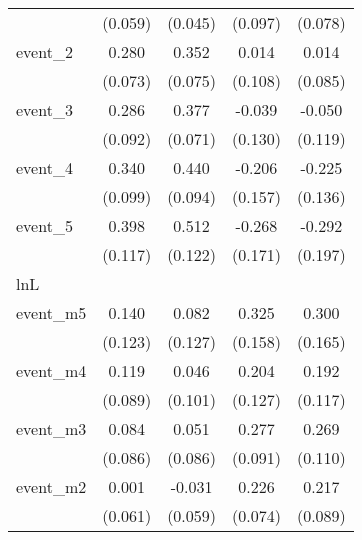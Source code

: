 {\begin{tabular}{l*{4}{c}}
            &     (0.059)         &     (0.045)         &     (0.097)         &     (0.078)         \\
[1em]
event\_2     &       0.280\sym{***}&       0.352\sym{***}&       0.014         &       0.014         \\
            &     (0.073)         &     (0.075)         &     (0.108)         &     (0.085)         \\
[1em]
event\_3     &       0.286\sym{**} &       0.377\sym{***}&      -0.039         &      -0.050         \\
            &     (0.092)         &     (0.071)         &     (0.130)         &     (0.119)         \\
[1em]
event\_4     &       0.340\sym{***}&       0.440\sym{***}&      -0.206         &      -0.225         \\
            &     (0.099)         &     (0.094)         &     (0.157)         &     (0.136)         \\
[1em]
event\_5     &       0.398\sym{***}&       0.512\sym{***}&      -0.268         &      -0.292         \\
            &     (0.117)         &     (0.122)         &     (0.171)         &     (0.197)         \\
\hline
lnL         &                     &                     &                     &                     \\
event\_m5    &       0.140         &       0.082         &       0.325\sym{*}  &       0.300         \\
            &     (0.123)         &     (0.127)         &     (0.158)         &     (0.165)         \\
[1em]
event\_m4    &       0.119         &       0.046         &       0.204         &       0.192         \\
            &     (0.089)         &     (0.101)         &     (0.127)         &     (0.117)         \\
[1em]
event\_m3    &       0.084         &       0.051         &       0.277\sym{**} &       0.269\sym{*}  \\
            &     (0.086)         &     (0.086)         &     (0.091)         &     (0.110)         \\
[1em]
event\_m2    &       0.001         &      -0.031         &       0.226\sym{**} &       0.217\sym{*}  \\
            &     (0.061)         &     (0.059)         &     (0.074)         &     (0.089)         \\

\end{tabular}}
